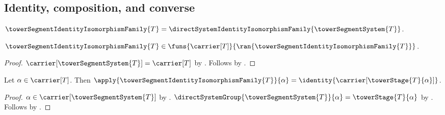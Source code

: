 \subsection{Identity, composition, and converse}

\begin{definition}\label{tower_segment_identity_isomorphism_family}
    $\towerSegmentIdentityIsomorphismFamily{T}=
        \directSystemIdentityIsomorphismFamily{\towerSegmentSystem{T}}$.
\end{definition}

\begin{proposition}\label{tower_segment_identity_isomorphism_family_type}
    $\towerSegmentIdentityIsomorphismFamily{T}\in
        \funs{\carrier[T]}{
            \ran{\towerSegmentIdentityIsomorphismFamily{T}}}$.
\end{proposition}
\begin{proof}
    $\carrier[\towerSegmentSystem{T}]=\carrier[T]$ by
        .
    Follows by
        .
\end{proof}

\begin{proposition}\label{tower_segment_identity_isomorphism_family_apply}
    Let $\alpha\in\carrier[T]$.
    Then $\apply{\towerSegmentIdentityIsomorphismFamily{T}}{\alpha}=
        \identity{\carrier[\towerStage{T}{\alpha}]}$.
\end{proposition}
\begin{proof}
    $\alpha\in\carrier[\towerSegmentSystem{T}]$ by
        .
    $\directSystemGroup{\towerSegmentSystem{T}}{\alpha}=
        \towerStage{T}{\alpha}$ by
        .
    Follows by
        .
\end{proof}

